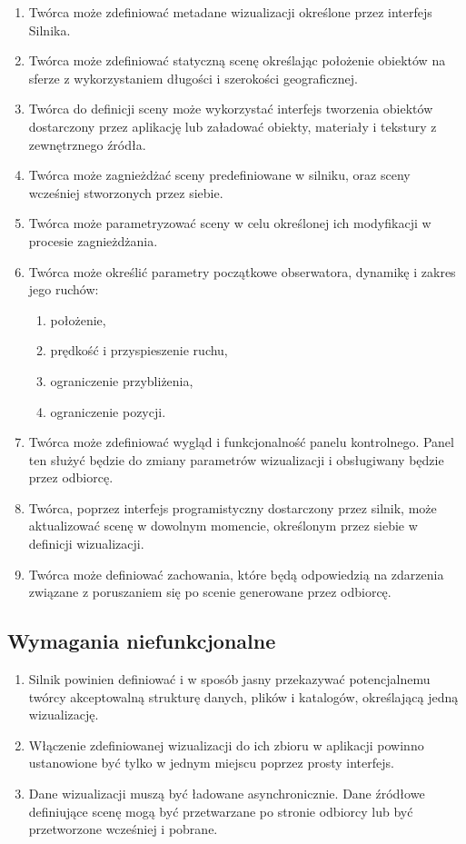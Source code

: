 \begin{enumerate}
    \item Twórca może zdefiniować metadane wizualizacji określone przez interfejs Silnika.
    \item Twórca może zdefiniować statyczną scenę określając położenie obiektów na sferze z wykorzystaniem
          długości i szerokości geograficznej.
    \item Twórca do definicji sceny może wykorzystać interfejs tworzenia obiektów dostarczony przez aplikację
          lub załadować obiekty, materiały i tekstury z zewnętrznego źródła.
    \item Twórca może zagnieżdżać sceny predefiniowane w silniku, oraz sceny wcześniej stworzonych przez siebie.
    \item Twórca może parametryzować sceny w celu określonej ich modyfikacji w procesie zagnieżdżania.
    \item Twórca może określić parametry początkowe obserwatora, dynamikę i zakres jego ruchów:
          \begin{enumerate}
              \item położenie,
              \item prędkość i przyspieszenie ruchu,
              \item ograniczenie przybliżenia,
              \item ograniczenie pozycji.
          \end{enumerate}
    \item Twórca może zdefiniować wygląd i funkcjonalność panelu kontrolnego.
          Panel ten służyć będzie do zmiany parametrów wizualizacji i obsługiwany będzie przez odbiorcę.
    \item Twórca, poprzez interfejs programistyczny dostarczony przez silnik, może aktualizować scenę w dowolnym momencie, określonym przez siebie w definicji wizualizacji.
    \item Twórca może definiować zachowania, które będą odpowiedzią na zdarzenia związane z poruszaniem się po scenie generowane przez odbiorcę.
\end{enumerate}

\subsection{Wymagania niefunkcjonalne}

\begin{enumerate}
    \item Silnik powinien definiować i w sposób jasny przekazywać potencjalnemu twórcy akceptowalną strukturę danych, plików i katalogów, określającą jedną wizualizację.
    \item Włączenie zdefiniowanej wizualizacji do ich zbioru w aplikacji powinno ustanowione być tylko w jednym miejscu poprzez prosty interfejs.
    \item Dane wizualizacji muszą być ładowane asynchronicznie. Dane źródłowe definiujące scenę mogą być przetwarzane po stronie odbiorcy lub być przetworzone wcześniej i pobrane.
\end{enumerate}

